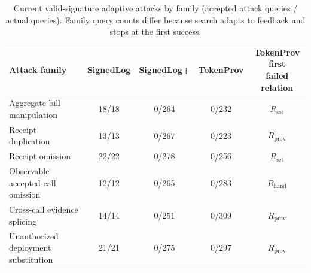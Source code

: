 \begin{table}[!t]
\centering
\caption{Current valid-signature adaptive attacks by family (accepted attack queries / actual queries). Family query counts differ because search adapts to feedback and stops at the first success.}
\label{tab:e-attack-families}
\footnotesize
\renewcommand{\arraystretch}{1.10}
\begin{tabular*}{\textwidth}{@{\hspace{4pt}}l@{\extracolsep{\fill}}cccc@{\hspace{4pt}}}
\toprule
\textbf{Attack family} & \textbf{SignedLog} & \textbf{SignedLog+} & \textbf{TokenProv} & \shortstack{\textbf{TokenProv first}\\\textbf{failed relation}} \\
\midrule
Aggregate bill manipulation & 18/18 & 0/264 & 0/232 & $R_{\mathrm{set}}$ \\
Receipt duplication & 13/13 & 0/267 & 0/223 & $R_{\mathrm{prov}}$ \\
Receipt omission & 22/22 & 0/278 & 0/256 & $R_{\mathrm{set}}$ \\
Observable accepted-call omission & 12/12 & 0/265 & 0/283 & $R_{\mathrm{hand}}$ \\
Cross-call evidence splicing & 14/14 & 0/251 & 0/309 & $R_{\mathrm{prov}}$ \\
Unauthorized deployment substitution & 21/21 & 0/275 & 0/297 & $R_{\mathrm{prov}}$ \\
\bottomrule
\end{tabular*}
\end{table}
